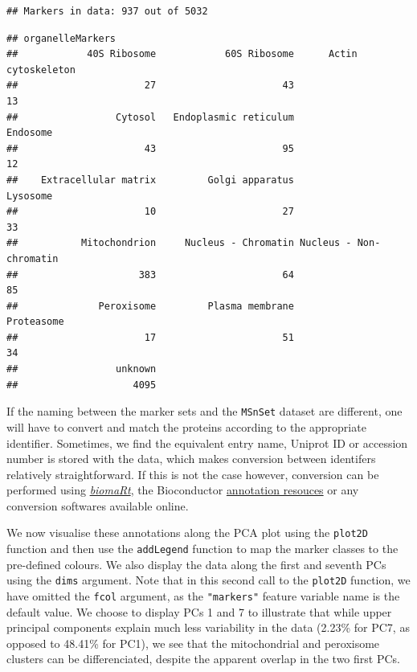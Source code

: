 \begin{verbatim}
## Markers in data: 937 out of 5032
\end{verbatim}

\begin{verbatim}
## organelleMarkers
##            40S Ribosome            60S Ribosome      Actin cytoskeleton 
##                      27                      43                      13 
##                 Cytosol   Endoplasmic reticulum                Endosome 
##                      43                      95                      12 
##    Extracellular matrix         Golgi apparatus                Lysosome 
##                      10                      27                      33 
##           Mitochondrion     Nucleus - Chromatin Nucleus - Non-chromatin 
##                     383                      64                      85 
##              Peroxisome         Plasma membrane              Proteasome 
##                      17                      51                      34 
##                 unknown 
##                    4095
\end{verbatim}

If the naming between the marker sets and the \texttt{MSnSet} dataset
are different, one will have to convert and match the proteins according
to the appropriate identifier. Sometimes, we find the equivalent entry
name, Uniprot ID or accession number is stored with the data, which
makes conversion between identifers relatively straightforward. If this
is not the case however, conversion can be performed using
\emph{\href{http://bioconductor.org/packages/biomaRt}{biomaRt}}, the
Bioconductor
\href{http://bioconductor.org/help/workflows/annotation/Annotation_Resources/}{annotation
resouces} or any conversion softwares available online.

We now visualise these annotations along the PCA plot using the
\texttt{plot2D} function and then use the \texttt{addLegend} function to
map the marker classes to the pre-defined colours. We also display the
data along the first and seventh PCs using the \texttt{dims} argument.
Note that in this second call to the \texttt{plot2D} function, we have
omitted the \texttt{fcol} argument, as the \texttt{"markers"} feature
variable name is the default value. We choose to display PCs 1 and 7 to
illustrate that while upper principal components explain much less
variability in the data (2.23\% for PC7, as opposed to 48.41\% for PC1),
we see that the mitochondrial and peroxisome clusters can be
differenciated, despite the apparent overlap in the two first PCs.

